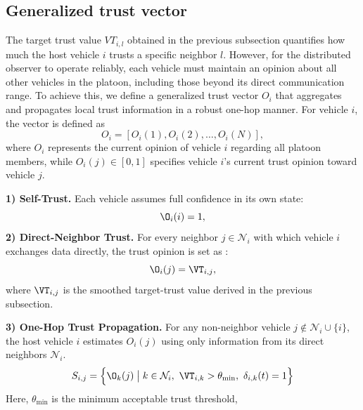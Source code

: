 \vspace*{-0.3cm}
\subsection{Generalized trust vector}
\label{subsec_generalized_trust_vector}
\vspace*{-0.2cm}
The target trust value $VT_{i,l}$ obtained in the previous subsection quantifies how much the host vehicle $i$ trusts a specific neighbor $l$.
However, for the distributed observer to operate reliably, each vehicle must maintain an opinion about all other vehicles in the platoon, including those beyond its direct communication range.
To achieve this, we define a generalized trust vector 
$O_i$ that aggregates and propagates local trust information in a robust one-hop manner. For vehicle $i$, the vector is defined as
\begin{equation}
O_i = [O_i(1), O_i(2), \ldots, O_i(N)] ,
\end{equation}
where $O_i$ represents the current opinion of vehicle $i$ regarding all platoon members, while $O_i(j) \in [0,1]$ specifies vehicle $i$'s current trust opinion toward vehicle $j$.

\vspace{1ex}
\noindent\textbf{1) Self-Trust.}
Each vehicle assumes full confidence in its own state:
\begin{equation}
\O_i(i) = 1 ,
\end{equation}
\vspace{1ex}
\noindent\textbf{2) Direct-Neighbor Trust.}
For every neighbor $j\in\mathcal{N}_i$ with which vehicle $i$ exchanges data directly, the trust opinion is set as :
\begin{equation}
\O_i(j) = \VT_{i,j} ,
\end{equation}
where $\VT_{i,j}$ is the smoothed target-trust value derived in the previous subsection.

\vspace{1ex}
\noindent\textbf{3) One-Hop Trust Propagation.}
For any non-neighbor vehicle $j\notin\mathcal{N}_i\cup\{i\}$, 
the host vehicle $i$ estimates $O_i(j)$ using only information from its direct neighbors $\mathcal{N}_i$.
\begin{equation}
S_{i,j} =
\Bigl\{ \O_k(j)
\;\big|\;
k \in \mathcal{N}_i,~
\VT_{i,k} > \theta_{\min},~
\delta_{i,k}(t) = 1\Bigr\}
\label{eq:Sij}
\end{equation}
Here, $\theta_{\min}$ is the minimum acceptable trust threshold, 

